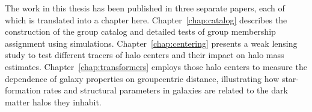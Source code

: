 The work in this thesis has been published in three separate papers,
each of which is translated into a chapter
here. Chapter~\ref{chap:catalog} \citep{George2011} describes the
construction of the group catalog and detailed tests of group
membership assignment using simulations. Chapter~\ref{chap:centering}
\citep{George2012} presents a weak lensing study to test different
tracers of halo centers and their impact on halo mass
estimates. Chapter~\ref{chap:transformers} \citep{George2013} employs
those halo centers to measure the dependence of galaxy properties on
groupcentric distance, illustrating how star-formation rates and
structural parameters in galaxies are related to the dark matter halos
they inhabit.

